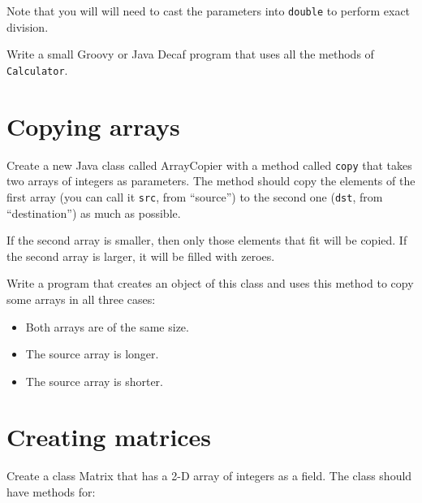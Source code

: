 \documentclass{article}
\begin{document}
Note that you will will need to cast the parameters into \verb+double+
to perform exact division. 

Write a small Groovy or Java Decaf program that uses all the methods of
\verb+Calculator+.



\section{Copying arrays}
\label{sec:copying-arrays}

Create a new Java class called ArrayCopier with a method called
\verb+copy+ that takes two arrays of integers as parameters. The
method should copy the elements of the first array (you can call it
\verb+src+, from ``source'') to the second one (\verb+dst+, from
``destination'') as much as possible.

If the second array is smaller, then only those elements that fit will
be copied. If the second array is larger, it will be filled with
zeroes. 

Write a program that creates an object of this class and uses this
method to copy some arrays in all three cases: 

\begin{itemize}
\item Both arrays are of the same size.
\item The source array is longer.
\item The source array is shorter. 
\end{itemize}

\section{Creating matrices}
\label{sec:creating-matrices}

Create a class Matrix that has a 2-D array of integers as a field. The
class should have methods for: 
\end{document}
